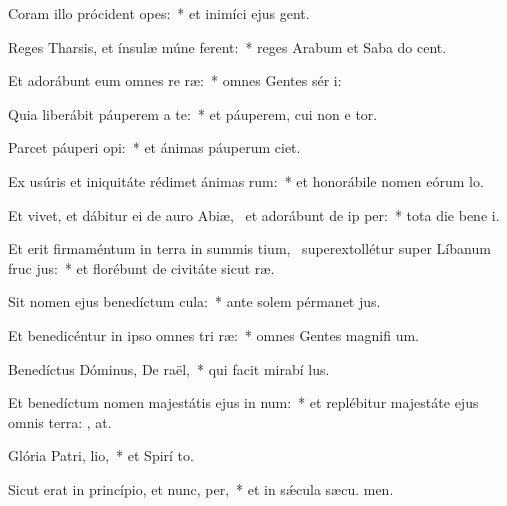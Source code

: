 \item Coram illo prócident opes:~* et inimíci ejus  gent.
\item Reges Tharsis, et ínsulæ múne ferent:~* reges Arabum et Saba do cent.
\item Et adorábunt eum omnes re ræ:~* omnes Gentes sér i:
\item Quia liberábit páuperem a te:~* et páuperem, cui non e tor.
\item Parcet páuperi  opi:~* et ánimas páuperum  ciet.
\item Ex usúris et iniquitáte rédimet ánimas rum:~* et honorábile nomen eórum  lo.
\item Et vivet, et dábitur ei de auro Abiæ,~\pscross{} et adorábunt de ip per:~* tota die bene i.
\item Et erit firmaméntum in terra in summis tium,~\pscross{} superextollétur super Líbanum fruc jus:~* et florébunt de civitáte sicut  ræ.
\item Sit nomen ejus benedíctum  cula:~* ante solem pérmanet  jus.
\item Et benedicéntur in ipso omnes tri ræ:~* omnes Gentes magnifi um.
\item Benedíctus Dóminus, De raël,~* qui facit mirabí lus.
\item Et benedíctum nomen majestátis ejus in num:~* et replébitur majestáte ejus omnis terra: , at.
\item Glória Patri,  lio,~* et Spirí to.
\item Sicut erat in princípio, et nunc,  per,~* et in sǽcula sæcu. men.
